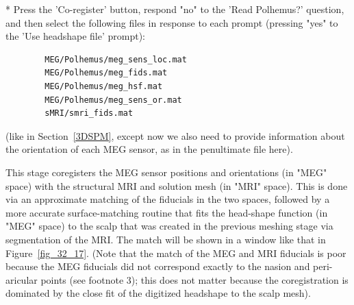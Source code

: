 * Press the 'Co-register' button, respond "no" to the 'Read Polhemus?' question, and then select the following files in response to each prompt (pressing "yes" to the 'Use headshape file' prompt):
\begin{verbatim}
        MEG/Polhemus/meg_sens_loc.mat
        MEG/Polhemus/meg_fids.mat
        MEG/Polhemus/meg_hsf.mat    
        MEG/Polhemus/meg_sens_or.mat    
        sMRI/smri_fids.mat
\end{verbatim}
    (like in Section~\ref{3DSPM}, except now we also need to provide information about the orientation of each MEG sensor, as in the penultimate file here).

This stage coregisters the MEG sensor positions and orientations (in "MEG" space) with the structural MRI and solution mesh (in "MRI" space). This is done via an approximate matching of the fiducials in the two spaces, followed by a more accurate surface-matching routine that fits the head-shape function (in "MEG" space) to the scalp that was created in the previous meshing stage via segmentation of the MRI. The match will be shown in a window like that in Figure~\ref{fig_32_17}. (Note that the match of the MEG and MRI fiducials is poor because the MEG fiducials did not correspond exactly to the nasion and peri-aricular points (see footnote 3); this does not matter because the coregistration is dominated by the close fit of the digitized headshape to the scalp mesh).

